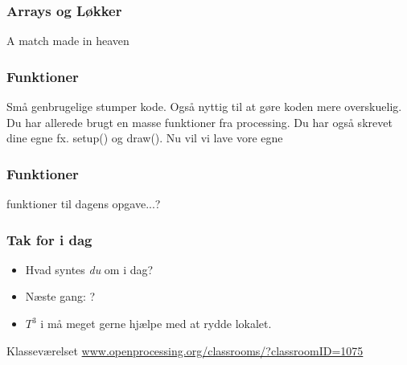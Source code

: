 \documentclass{beamer}
\begin{document}
\begin{frame}[fragile]
  \frametitle{Arrays og Løkker}
  
  {\tiny A match made in heaven}
   
\end{frame}


\begin{frame}[fragile]
  \frametitle{Funktioner}
  
  {\tiny Små genbrugelige stumper kode. Også nyttig til at gøre koden mere overskuelig. Du har allerede brugt en masse funktioner fra processing. Du har også skrevet dine egne fx. setup() og draw(). Nu vil vi lave vore egne}  
\end{frame}

\begin{frame}[fragile]
  \frametitle{Funktioner}
  
  {\tiny funktioner til dagens opgave...?}  
\end{frame}


\begin{frame}
  \frametitle{Tak for i dag}

  \begin{itemize}
  \item Hvad syntes \emph{du} om i dag?
  \item Næste gang: ?
  \item $T^3$ i må meget gerne hjælpe med at rydde lokalet.
  \end{itemize}

  \begin{block}{Klasseværelset}
    \url{www.openprocessing.org/classrooms/?classroomID=1075}
  \end{block}

\end{frame}
\end{document}
